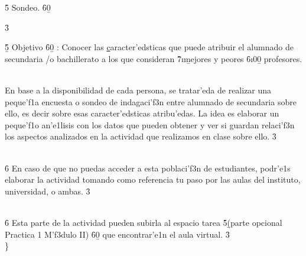 \documentclass[
]{article}
\begin{document}
\f5  \ul {} Sondeo. \f6\b0\\
\pard{}

\f3  \ulnone \\
\pard{}\qj{}

\f5\b {} Objetivo \f6\b0 : Conocer las \ul caracter'edsticas que puede
atribuir el \ulnone alumnado de secundaria /o bachillerato a los que
consideran \f7\i\b mejores y peores \f6\i0\b0 profesores.\\
\strut \\
En base a la disponibilidad de cada persona, se tratar'eda de realizar
una peque'f1a encuesta o sondeo de indagaci'f3n entre alumnado de
secundaria sobre ello, es decir sobre esas caracter'edsticas
atribu'edas. La idea es elaborar un peque'f1o an'e1lisis con los datos
que pueden obtener y ver si guardan relaci'f3n los aspectos analizados
en la actividad que realizamos en clase sobre ello. \f3\\
\pard{}\qj{}  \strike {}\\
\pard{}\qj{}

\f6   En caso de que no puedas acceder a esta
poblaci'f3n de estudiantes, podr'e1s elaborar la actividad tomando como
referencia tu paso por las aulas del instituto, universidad, o ambas.
\f3\\
\strut \\

\f6 Esta parte de la actividad pueden subirla al espacio tarea
\f5\b (parte opcional Practica 1 M'f3dulo II) \f6\b0 que encontrar'e1n
el aula virtual. \f3\\
\}
\end{document}
